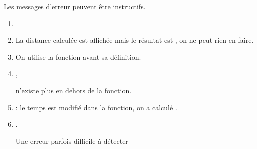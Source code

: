 Les messages d'erreur peuvent être instructifs.

\begin{enumerate}

\item {}

\item {} La distance calculée est affichée mais le résultat est 
, on ne peut rien en faire.

\item {}

On utilise la fonction avant sa définition.

\item {}, 

 n'existe plus en dehors de la fonction.

\item {} : le temps est modifié dans la fonction, on a calculé .

\item {}.

Une erreur parfois difficile à détecter
\end{enumerate}





